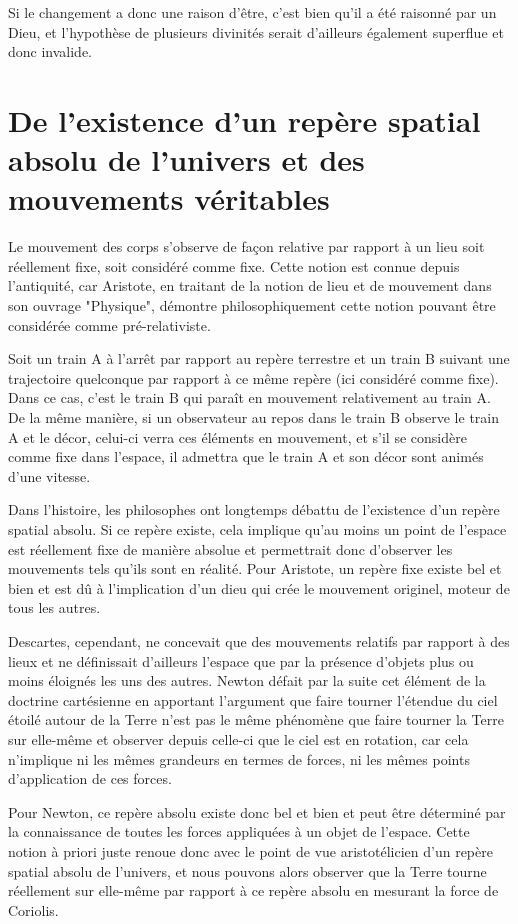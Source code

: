 Si le changement a donc une raison d'être, c'est bien qu'il a été raisonné par un Dieu, et l'hypothèse de plusieurs divinités serait d'ailleurs également superflue et donc invalide.

\chapter{De l’existence d’un repère spatial absolu de l’univers et des mouvements véritables}

Le mouvement des corps s’observe de façon relative par rapport à un lieu soit réellement fixe, soit considéré comme fixe. Cette notion est connue depuis l’antiquité, car Aristote, en traitant de la notion de lieu et de mouvement dans son ouvrage "Physique", démontre philosophiquement cette notion pouvant être considérée comme pré-relativiste.

Soit un train A à l’arrêt par rapport au repère terrestre et un train B suivant une trajectoire quelconque par rapport à ce même repère (ici considéré comme fixe). Dans ce cas, c’est le train B qui paraît en mouvement relativement au train A. De la même manière, si un observateur au repos dans le train B observe le train A et le décor, celui-ci verra ces éléments en mouvement, et s’il se considère comme fixe dans l’espace, il admettra que le train A et son décor sont animés d’une vitesse.

Dans l’histoire, les philosophes ont longtemps débattu de l’existence d’un repère spatial absolu. Si ce repère existe, cela implique qu’au moins un point de l’espace est réellement fixe de manière absolue et permettrait donc d’observer les mouvements tels qu’ils sont en réalité. Pour Aristote, un repère fixe existe bel et bien et est dû à l'implication d'un dieu qui crée le mouvement originel, moteur de tous les autres.

Descartes, cependant, ne concevait que des mouvements relatifs par rapport à des lieux et ne définissait d’ailleurs l’espace que par la présence d’objets plus ou moins éloignés les uns des autres. Newton défait par la suite cet élément de la doctrine cartésienne en apportant l’argument que faire tourner l’étendue du ciel étoilé autour de la Terre n’est pas le même phénomène que faire tourner la Terre sur elle-même et observer depuis celle-ci que le ciel est en rotation, car cela n’implique ni les mêmes grandeurs en termes de forces, ni les mêmes points d’application de ces forces.

Pour Newton, ce repère absolu existe donc bel et bien et peut être déterminé par la connaissance de toutes les forces appliquées à un objet de l’espace. Cette notion à priori juste renoue donc avec le point de vue aristotélicien d’un repère spatial absolu de l’univers, et nous pouvons alors observer que la Terre tourne réellement sur elle-même par rapport à ce repère absolu en mesurant la force de Coriolis.

